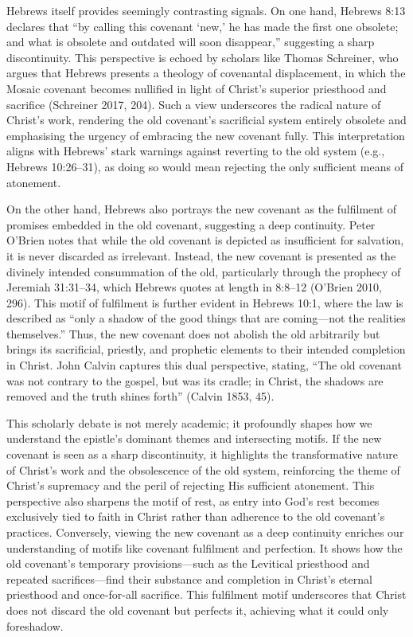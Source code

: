 \documentclass[12pt]{article}
\begin{document}
Hebrews itself provides seemingly contrasting signals. On one hand, Hebrews 8:13
declares that “by calling this covenant ‘new,’ he has made the first one
obsolete; and what is obsolete and outdated will soon disappear,” suggesting a
sharp discontinuity. This perspective is echoed by scholars like Thomas
Schreiner, who argues that Hebrews presents a theology of covenantal
displacement, in which the Mosaic covenant becomes nullified in light of
Christ’s superior priesthood and sacrifice (Schreiner 2017, 204). Such a view
underscores the radical nature of Christ’s work, rendering the old covenant’s
sacrificial system entirely obsolete and emphasising the urgency of embracing
the new covenant fully. This interpretation aligns with Hebrews’ stark warnings
against reverting to the old system (e.g., Hebrews 10:26--31), as doing so would
mean rejecting the only sufficient means of atonement.

On the other hand, Hebrews also portrays the new covenant as the fulfilment of
promises embedded in the old covenant, suggesting a deep continuity. Peter
O’Brien notes that while the old covenant is depicted as insufficient for
salvation, it is never discarded as irrelevant. Instead, the new covenant is
presented as the divinely intended consummation of the old, particularly through
the prophecy of Jeremiah 31:31--34, which Hebrews quotes at length in 8:8--12
(O’Brien 2010, 296). This motif of fulfilment is further evident in Hebrews
10:1, where the law is described as “only a shadow of the good things that are
coming---not the realities themselves.” Thus, the new covenant does not abolish
the old arbitrarily but brings its sacrificial, priestly, and prophetic elements
to their intended completion in Christ. John Calvin captures this dual
perspective, stating, “The old covenant was not contrary to the gospel, but was
its cradle; in Christ, the shadows are removed and the truth shines forth”
(Calvin 1853, 45).

This scholarly debate is not merely academic; it profoundly shapes how we
understand the epistle’s dominant themes and intersecting motifs. If the new
covenant is seen as a sharp discontinuity, it highlights the transformative
nature of Christ’s work and the obsolescence of the old system, reinforcing the
theme of Christ’s supremacy and the peril of rejecting His sufficient atonement.
This perspective also sharpens the motif of rest, as entry into God’s rest
becomes exclusively tied to faith in Christ rather than adherence to the old
covenant’s practices. Conversely, viewing the new covenant as a deep continuity
enriches our understanding of motifs like covenant fulfilment and perfection. It
shows how the old covenant’s temporary provisions—such as the Levitical
priesthood and repeated sacrifices—find their substance and completion in
Christ’s eternal priesthood and once-for-all sacrifice. This fulfilment motif
underscores that Christ does not discard the old covenant but perfects it,
achieving what it could only foreshadow.
\end{document}
